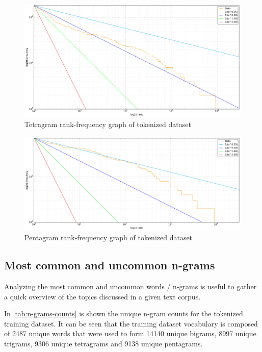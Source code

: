 \begin{figure}[ht]
	\centering
	\includegraphics[width=0.9\linewidth]{figures/frequency-graphs/4-gram}
	\caption{Tetragram rank-frequency graph of tokenized dataset}
	\label{fig:rank-frequency-tetragram}
\end{figure}

\begin{figure}[ht]
	\centering
	\includegraphics[width=0.9\linewidth]{figures/frequency-graphs/5-gram}
	\caption{Pentagram rank-frequency graph of tokenized dataset}
	\label{fig:rank-frequency-pentagram}
\end{figure}



\subsection{Most common and uncommon n-grams}

Analyzing the most common and uncommon words / n-grams is useful to gather a quick overview of the topics discussed in a given text corpus.

In \cref{tab:n-grams-counts} is shown the unique n-gram counts for the tokenized training dataset. It can be seen that the training dataset vocabulary is composed of 2487 unique words that were used to form 14140 unique bigrams, 8997 unique trigrams, 9306 unique tetragrams and 9138 unique pentagrams.

